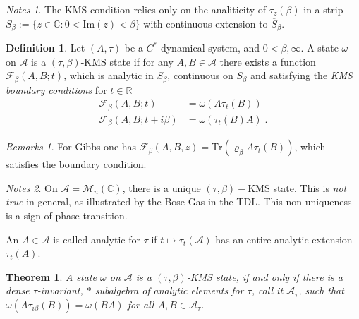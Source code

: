 \documentclass[
a4paper, %
11pt, %
onecolumn, %
openany, %
]{memoir}
\theoremstyle{definition}
\newtheorem{definition}{Definition}[chapter]
\theoremstyle{remark}
\newtheorem{remarks}{Remarks}[chapter]
\newtheorem{notes}{Notes}[chapter]
\theoremstyle{plain}
\newtheorem{theorem}{Theorem}[chapter]
\begin{document}
\begin{notes}The KMS condition relies only on the analiticity of $\tau_z(\beta)$ in a strip $S_{\beta}:=\{z\in \mathbb{C}:0<\mathrm{Im}(z)<\beta\}$ with continuous extension to $\overline{S}_{\beta}$.
	\end{notes}
\begin{definition}
	Let $(A,\tau)$ be a $C^*$-dynamical system, and $0<\beta,\infty$. A state $\omega$ on $\mathcal{A}$ is a $(\tau,\beta)$-KMS state if for any $A,B\in \mathcal{A}$ there exists a function $\mathcal{F}_{\beta}(A,B;t)$, which is analytic in $S_{\beta}$, continuous on $\overline{S}_{\beta}$ and satisfying the \textit{KMS boundary conditions} for $t\in\mathbb{R}$ \begin{align}
	\mathcal{F}_{\beta}(A,B;t)&=\omega(A\tau_t(B))\\
	\mathcal{F}_{\beta}(A,B;t+i\beta)&=\omega(\tau_t(B)A)\; .
	\end{align}
\end{definition}
\begin{remarks}
	For Gibbs one has $\mathcal{F}_{\beta}(A,B,z)=\mathrm{Tr}(\varrho_{\beta}A\tau_t(B))$, which satisfies the boundary condition.
\end{remarks}
\begin{notes}
	On $\mathcal{A}=\mathcal{M}_n(\mathbb{C})$, there is a unique $(\tau,\beta)-$KMS state. This is \textit{not true} in general, as illustrated by the Bose Gas in  the TDL. This non-uniqueness is a sign of phase-transition.
\end{notes}
An $A\in\mathcal{A}$ is called analytic for $\tau$ if $t\mapsto \tau_t(\mathcal{A})$ has an entire analytic extension $\tau_t(A)$.
\begin{theorem}
	A state $\omega$ on $\mathcal{A}$ is a $(\tau,\beta)$-KMS state, if and only if there is a dense $\tau$-invariant, $*$ subalgebra of analytic elements for $\tau$, call it $\mathcal{A}_{\tau}$, such that $\omega(A\tau_{i\beta}(B))=\omega(BA)$ for all $A,B\in \mathcal{A}_{\tau}$.
\end{theorem}
\end{document}
